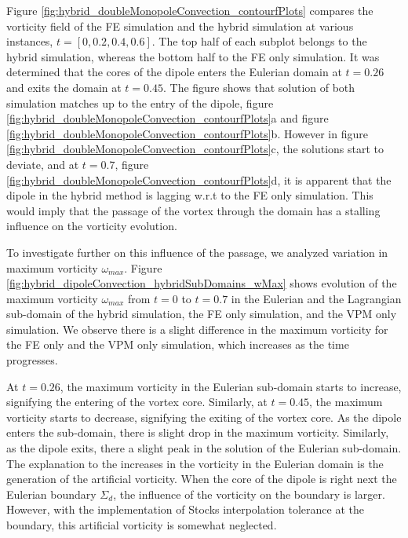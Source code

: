Figure \ref{fig:hybrid_doubleMonopoleConvection_contourfPlots} compares the vorticity field of the FE simulation and the hybrid simulation at various instances, $t=[0,0.2,0.4,0.6]$. The top half of each subplot belongs to the hybrid simulation, whereas the bottom half to the FE only simulation. It was determined that the cores of the dipole enters the Eulerian domain at $t=0.26$ and exits the domain at $t=0.45$. The figure shows that solution of both simulation matches up to the entry of the dipole, figure \ref{fig:hybrid_doubleMonopoleConvection_contourfPlots}a and figure \ref{fig:hybrid_doubleMonopoleConvection_contourfPlots}b. However in figure \ref{fig:hybrid_doubleMonopoleConvection_contourfPlots}c, the solutions start to deviate, and at $t=0.7$, figure \ref{fig:hybrid_doubleMonopoleConvection_contourfPlots}d, it is apparent that the dipole in the hybrid method is lagging w.r.t to the FE only simulation. This would imply that the passage of the vortex through the domain has a stalling influence on the vorticity evolution.

To investigate further on this influence of the passage, we analyzed variation in maximum vorticity $\omega_{max}$. Figure \ref{fig:hybrid_dipoleConvection_hybridSubDomains_wMax} shows evolution of the maximum vorticity $\omega_{max}$ from $t=0$ to $t=0.7$ in the Eulerian and the Lagrangian sub-domain of the hybrid simulation, the FE only simulation, and the VPM only simulation. We observe there is a slight difference in the maximum vorticity for the FE only and the VPM only simulation, which increases as the time progresses.

At $t=0.26$, the maximum vorticity in the Eulerian sub-domain starts to increase, signifying the entering of the vortex core. Similarly, at $t=0.45$, the maximum vorticity starts to decrease, signifying the exiting of the vortex core. As the dipole enters the sub-domain, there is slight drop in the maximum vorticity. Similarly, as the dipole exits, there a slight peak in the solution of the Eulerian sub-domain. The explanation to the increases in the vorticity in the Eulerian domain is the generation of the artificial vorticity. When the core of the dipole is right next the Eulerian boundary $\Sigma_d$, the influence of the vorticity on the boundary is larger. However, with the implementation of Stocks interpolation tolerance at the boundary, this artificial vorticity is somewhat neglected.
	
